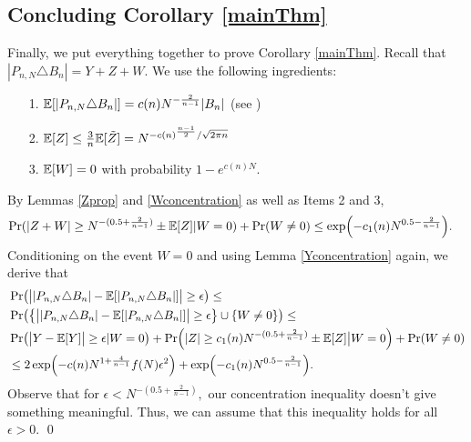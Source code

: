 
\subsection{Concluding Corollary \ref{mainThm}}\label{proofsectionmainthm}

Finally, we put everything together to prove Corollary \ref{mainThm}. Recall that $|P_{n,N} \triangle B_n| = Y+Z+W.$  We  use  the following ingredients:
\begin{enumerate}
	\item[1.] $ {\mathbb{E}}[|P_{n,N} \triangle B_n|] = c(n)N^{-\frac 2{n-1}}|B_n|$ (see \cite[Theorem 2.1]{kur2017approximation})
	\item[2.] $ {\mathbb{E}}[Z] \leq \frac{3}{n}{\mathbb{E}}[\tilde{Z}] = N^{-c(n)^{\frac{n-1}{2}}/\sqrt{2\pi n}} $
	\item[3.] $ {\mathbb{E}}[W] = 0$ with probability $ 1-e^{c(n)N} $. 
\end{enumerate}	
By  Lemmas  \ref{Zprop} and \ref{Wconcentration} as well as Items 2 and 3,  
\begin{align*}
\Pr(|Z+W| \geq N^{-(0.5+\frac{2}{n-1})}\pm \E[Z]|W = 0) + \Pr(W \ne 0) &\leq\exp\left(-c_1(n)N^{0.5-\frac{2}{n-1}}\right).
\end{align*}
Conditioning on the event $W=0$ and using Lemma \ref{Yconcentration} again, we derive that
\begin{align*}
&\Pr\left(\big||P_{n,N}\triangle B_n| - \E[|P_{n,N}\triangle B_n|]\big| \geq \epsilon \right) \leq
\\&\Pr\left(\left\{\big||P_{n,N}\triangle B_n| - \E[|P_{n,N}\triangle B_n|]\big| \geq \epsilon\right\} \cup \{W \ne 0\} \right) \leq
\\& \Pr\left(\big|Y - \E[Y]\big| \geq \epsilon| W=0 \right) + \Pr\left(|Z| \geq c_1(n)N^{-(0.5+\frac{2}{n-1})} \pm \E[Z] \big| W=0\right) +\Pr(W \ne 0)
\\& \leq 2\exp\left(-c(n)N^{1+\frac{4}{n-1}}f(N)\epsilon^2\right)+\exp\left(-c_1(n)N^{0.5-\frac{2}{n-1}}\right).
\end{align*}
Observe that for $ \epsilon < N^{-(0.5+\frac{2}{n-1})},$ our concentration inequality doesn't give something meaningful. Thus, we can assume that this inequality holds for all $ \epsilon > 0.$
\qed


